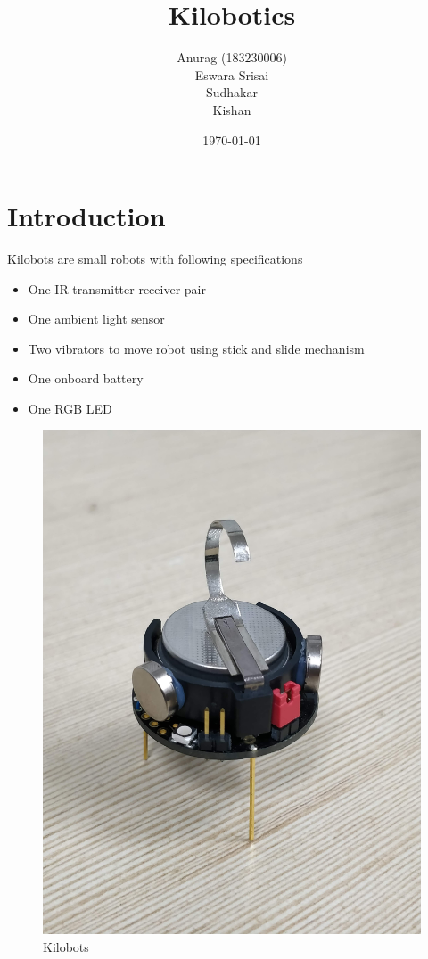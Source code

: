 \documentclass{article}
\title{Kilobotics}
\author{Anurag (183230006)\\ Eswara Srisai \\ Sudhakar \\ Kishan}
\date{\today}
\begin{document}
\maketitle

\section{Introduction}
Kilobots are small robots with following specifications
\begin{itemize}
    \item One IR transmitter-receiver pair
    \item One ambient light sensor
    \item Two vibrators to move robot using stick and slide mechanism
    \item One onboard battery
    \item One RGB LED
\end{itemize}
\begin{figure}[H]
    \centering
    \includegraphics[scale=0.04]{images/kilobots}
    \caption{Kilobots}
\end{figure}
\end{document}
